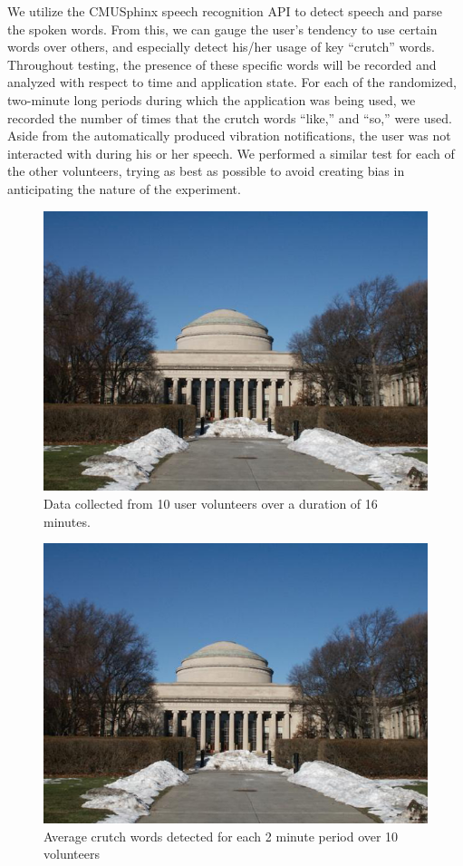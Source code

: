 \documentclass{sigchi}
\begin{document}
We utilize the CMUSphinx speech recognition API to detect speech and parse the spoken words. From this, we can gauge the user’s tendency to use certain words over others, and especially detect his/her usage of key “crutch” words. Throughout testing, the presence of these specific words will be recorded and analyzed with respect to time and application state.  For each of the randomized, two-minute long periods during which the application was being used, we recorded the number of times that the crutch words “like,” and “so,” were used. Aside from the automatically produced vibration notifications, the user was not interacted with during his or her speech. We performed a similar test for each of the other volunteers, trying as best as possible to avoid creating bias in anticipating the nature of the experiment.

\begin{figure}[!h]
\centering
\includegraphics[width=0.9\columnwidth]{Figure1}
\caption{Data collected from 10 user volunteers over a duration of 16 minutes.
}
\label{fig:figure2}
\end{figure}


\begin{figure}[!h]
\centering
\includegraphics[width=0.9\columnwidth]{Figure1}
\caption{Average crutch words detected for each 2 minute period over 10 volunteers
}
\label{fig:figure3}
\end{figure}
\end{document}
